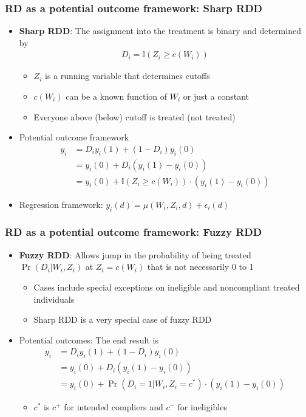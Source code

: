 \documentclass[aspectratio=169]{beamer}
\begin{document}
\begin{frame}
\frametitle{RD as a potential outcome framework: Sharp RDD}
\begin{itemize}
\item \textbf{Sharp RDD}: The assignment into the treatment is binary and determined by
\begin{align*}
D_i=\mathbb{I}(Z_i\geq c(W_i))
\end{align*}
\begin{itemize}
\item $Z_i$ is a running variable that determines cutoffs
\item  $c(W_i)$ can be a known function of $W_i$ or just a constant
\item Everyone above (below) cutoff is treated (not treated)
\end{itemize}
\item Potential outcome framework
\begin{align*}
y_i& = D_iy_i(1)+(1-D_i)y_i(0)\\
&=y_i(0)+D_i(y_i(1)-y_i(0))\\
&=y_i(0)+\mathbb{I}(Z_i\geq c(W_i))\cdot(y_i(1)-y_i(0))
\end{align*}
\item Regression framework: $y_i(d)=\mu(W_i,Z_i,d)+\epsilon_i(d)$
\end{itemize}
\end{frame}

\begin{frame}
\frametitle{RD as a potential outcome framework: Fuzzy RDD}
\begin{itemize}
\item \textbf{Fuzzy RDD}: Allows jump in the probability of being treated $\Pr(D_i|W_i, Z_i)$ at $Z_i=c(W_i)$ that is not necessarily 0 to 1
\begin{itemize}
\item Cases include special exceptions on ineligible and noncompliant treated individuals
\item Sharp RDD is a very special case of fuzzy RDD
\end{itemize}
\item Potential outcomes: The end result is 
\begin{align*}
y_i& = D_iy_i(1)+(1-D_i)y_i(0)\\
&=y_i(0)+D_i(y_i(1)-y_i(0))\\
&=y_i(0)+\Pr(D_i=1|W_i, Z_i=c^*)\cdot(y_i(1)-y_i(0))
\end{align*}
\begin{itemize}
\item $c^*$ is $c^+$ for intended compliers and $c^-$ for ineligibles
\end{itemize}
\end{itemize}
\end{frame}
\end{document}
